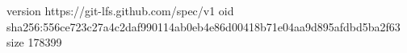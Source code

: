 version https://git-lfs.github.com/spec/v1
oid sha256:556ce723c27a4c2daf990114ab0eb4e86d00418b71e04aa9d895afdbd5ba2f63
size 178399
